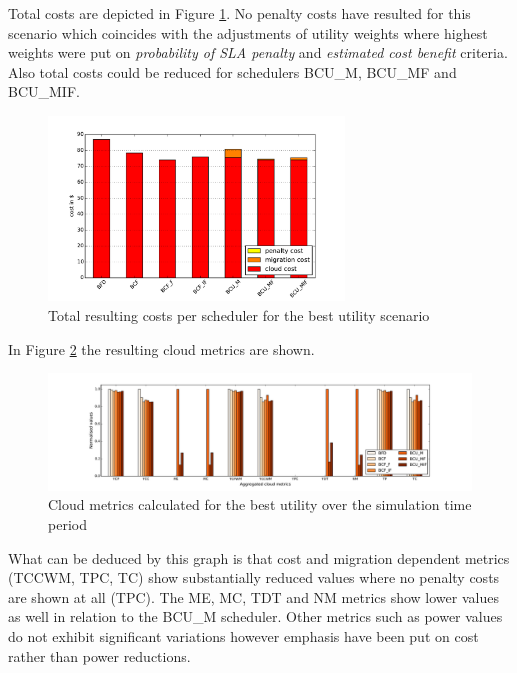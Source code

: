 Total costs are depicted in Figure \ref{fig:best_utility_total_cost}. No penalty costs have resulted for this scenario which coincides with the adjustments of utility weights where highest weights were put on \textit{probability of SLA penalty} and \textit{estimated cost benefit} criteria. 
Also total costs could be reduced for schedulers BCU\_M, BCU\_MF and BCU\_MIF. 

\begin{figure}[tbp]
	\centering
		\includegraphics[width=0.7\textwidth]{figures/evaluation_and_results/best_utility_total_cost.pdf}
	\caption{Total resulting costs per scheduler for the best utility scenario}
	\label{fig:best_utility_total_cost}
\end{figure}

In Figure \ref{fig:best_utility_cloud_metrics} the resulting cloud metrics are shown. 

\begin{figure}[htbp]
	\centering
	\hspace*{-1.2in}
		\includegraphics[width=1.50\textwidth]{figures/evaluation_and_results/best_utility_cloud_metrics.pdf}
	\caption{Cloud metrics calculated for the best utility over the simulation time period}
	\label{fig:best_utility_cloud_metrics}
\end{figure}

What can be deduced by this graph is that cost and migration dependent metrics (TCCWM, TPC, TC) show substantially reduced values where no penalty costs are shown at all (TPC). The ME, MC, TDT and NM metrics show lower values as well in relation to the BCU\_M scheduler. 
Other metrics such as power values do not exhibit significant variations however emphasis have been put on cost rather than power reductions. 


